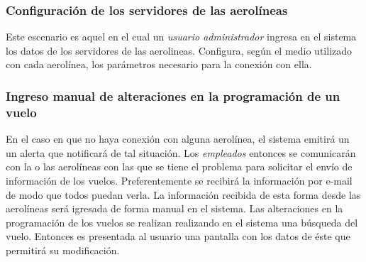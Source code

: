 \subsubsection{Configuración de los servidores de las aerolíneas}
Este escenario es aquel en el cual un \emph{usuario administrador} ingresa en el sistema los datos de los servidores de las aerolineas. Configura, según el medio utilizado con cada aerolínea, los parámetros necesario para la conexión con ella.

\subsubsection{Ingreso manual de alteraciones en la programación de un vuelo}
En el caso en que no haya conexión con alguna aerolínea, el sistema emitirá un un alerta que notificará de tal situación. Los \emph{empleados} entonces se comunicarán con la o las aerolíneas con las que se tiene el problema para solicitar el envío de información de los vuelos. Preferentemente se recibirá la información por e-mail de modo que todos puedan verla. 
La información recibida de esta forma desde las aerolíneas será igresada de forma manual en el sistema. Las alteraciones en la programación de los vuelos se realizan realizando en el sistema una búsqueda del vuelo. Entonces es presentada al usuario una pantalla con los datos de éste que permitirá su modificación.


